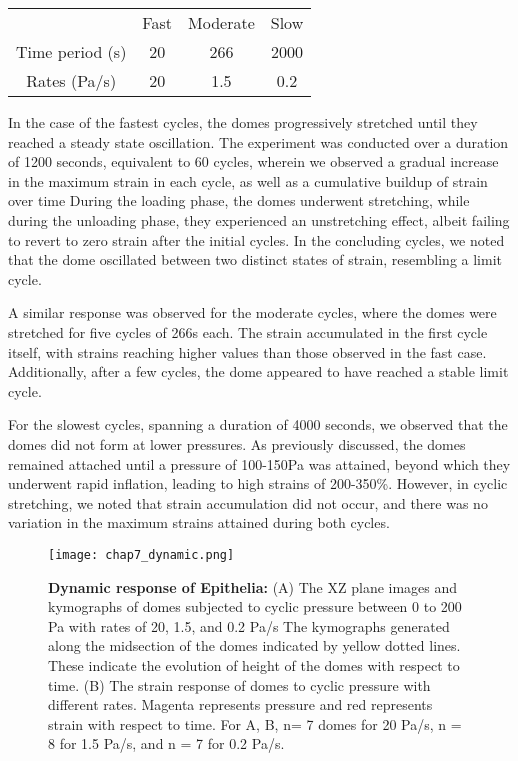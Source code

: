 \begin{center}
	\begin{table}[h!]
		\label{tab:hysteresis}
		\begin{tabular}{c c c c}
			& Fast & Moderate & Slow \\ 
			Time period (s) & 20   & 266      & 2000 \\ 
			Rates (Pa/s)    & 20   & 1.5      & 0.2  \\ 
		\end{tabular}
	\end{table}
\end{center}

In the case of the fastest cycles, the domes progressively stretched until they reached a steady state oscillation. The experiment was conducted over a duration of 1200 seconds, equivalent to 60 cycles, wherein we observed a gradual increase in the maximum strain in each cycle, as well as a cumulative buildup of strain over time During the loading phase, the domes underwent stretching, while during the unloading phase, they experienced an unstretching effect, albeit failing to revert to zero strain after the initial cycles. In the concluding cycles, we noted that the dome oscillated between two distinct states of strain, resembling a limit cycle.

A similar response was observed for the moderate cycles, where the domes were stretched for five cycles of 266s each. The strain accumulated in the first cycle itself, with strains reaching higher values than those observed in the fast case. Additionally, after a few cycles, the dome appeared to have reached a stable limit cycle.

For the slowest cycles, spanning a duration of 4000 seconds, we observed that the domes did not form at lower pressures. As previously discussed, the domes remained attached until a pressure of 100-150Pa was attained, beyond which they underwent rapid inflation, leading to high strains of 200-350\%. However, in cyclic stretching, we noted that strain accumulation did not occur, and there was no variation in the maximum strains attained during both cycles.

\begin{figure}[]
	\centering
	\texttt{[image: chap7\_dynamic.png]}
	\caption{\label{fig_7_6} \textbf{Dynamic response of Epithelia:} (A) The XZ plane images and kymographs of domes subjected to cyclic pressure between 0 to 200 Pa with rates of 20, 1.5, and 0.2 Pa/s The kymographs generated along the midsection of the domes indicated by yellow dotted lines. These indicate the evolution of height of the domes with respect to time. (B) The strain response of domes to cyclic pressure with different rates. Magenta represents pressure and red represents strain with respect to time. For A, B, n= 7 domes for 20 Pa/s, n = 8 for 1.5 Pa/s, and n = 7 for 0.2 Pa/s. 
	}
\end{figure}


